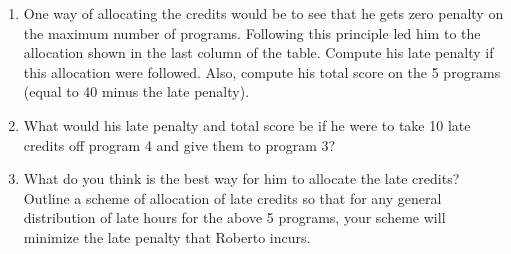 \begin{enumerate}
\item  One way of allocating the credits would be to see that he gets
  zero penalty on the maximum number of programs.  Following this
  principle led him to the allocation shown in the last column of the
  table. Compute his late penalty if this allocation were
  followed.  Also, compute his total score on the 5 programs (equal to
  $40$ minus the late penalty).
  
\item  What would his late penalty and total score be if he were
  to take 10 late credits off program 4 and give them to program 3?
  
\item  What do you think is the best way for him to allocate the late
  credits?  Outline a scheme of allocation of late credits so that for
  any general distribution of late hours for the above 5 programs,
  your scheme will minimize the late penalty that Roberto
  incurs.
\end{enumerate}


